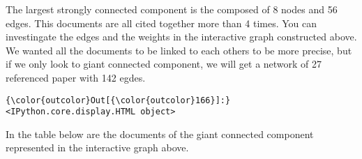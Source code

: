 \documentclass[journal,twocolumn]{IEEEtran}
\begin{document}
    \begin{figure}
        \begin{center}\end{center}
        \caption{}
        \label{}
    \end{figure}
    
    The largest strongly connected component is the composed of 8 nodes and
56 edges. This documents are all cited together more than 4 times. You
can investingate the edges and the weights in the interactive graph
constructed above. We wanted all the documents to be linked to each
others to be more precise, but if we only look to giant connected
component, we will get a network of 27 referenced paper with 142 egdes.


\begin{Verbatim}[commandchars=\\\{\}]
{\color{outcolor}Out[{\color{outcolor}166}]:} <IPython.core.display.HTML object>
\end{Verbatim}
            
    In the table below are the documents of the giant connected component
represented in the interactive graph above.
\end{document}

